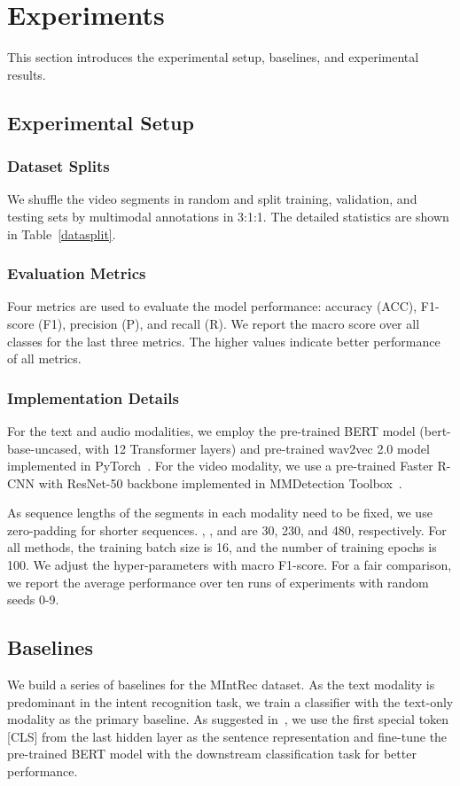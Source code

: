 \documentclass[sigconf,camera-ready]{acmart}
\begin{document}
\section{Experiments}
This section introduces the experimental setup, baselines, and experimental results. 

\subsection{Experimental Setup}
\subsubsection{Dataset Splits}
We shuffle the video segments in random and split training, validation, and testing sets by multimodal annotations in 3:1:1. The detailed statistics are shown in Table~\ref{datasplit}. 

\subsubsection{Evaluation Metrics}
Four metrics are used to evaluate the model performance:
accuracy (ACC), F1-score (F1), precision (P), and recall (R). We report the macro score over all classes for the last three metrics. The higher values indicate better performance of all metrics. 

\subsubsection{Implementation Details}
For the text and audio modalities, we employ the pre-trained BERT model (bert-base-uncased, with 12 Transformer layers) and pre-trained wav2vec 2.0 model implemented in PyTorch~\cite{wolf2020transformers}. For the video modality, we use a pre-trained Faster R-CNN with  ResNet-50 backbone implemented in  MMDetection Toolbox~\cite{chen2019mmdetection}.

As sequence lengths of the segments in each modality need to be fixed, we use zero-padding for shorter sequences. , , and   are 30, 230, and 480, respectively. For all methods, the training batch size is 16, and the number of training epochs is 100. We adjust the hyper-parameters with macro F1-score. For a fair comparison, we report the average performance over ten runs of experiments with random seeds 0-9. 

\subsection{Baselines}
We build a series of baselines for the MIntRec dataset. As the text modality is predominant in the intent recognition task, we train a classifier with the text-only modality as the primary baseline. As suggested in~\cite{BERT}, we use the first special token [CLS] from the last hidden layer as the sentence representation and fine-tune the pre-trained BERT model with the downstream classification task for better performance.  
\end{document}
